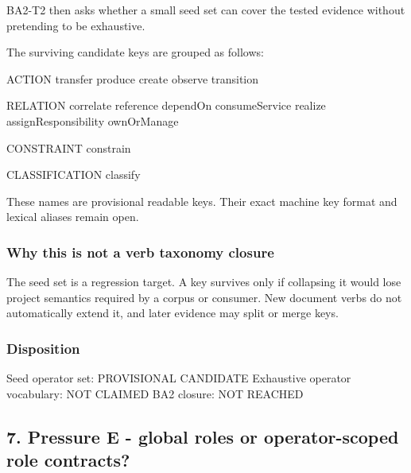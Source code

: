 \documentclass[
  10pt,
  letterpaper,
]{article}
\newenvironment{Shaded}{}{}
\newcommand{\NormalTok}[1]{#1}
\begin{document}
BA2-T2 then asks whether a small seed set can cover the tested evidence
without pretending to be exhaustive.

The surviving candidate keys are grouped as follows:

\begin{Shaded}
\begin{Highlighting}[]
\NormalTok{ACTION}
\NormalTok{  transfer}
\NormalTok{  produce}
\NormalTok{  create}
\NormalTok{  observe}
\NormalTok{  transition}

\NormalTok{RELATION}
\NormalTok{  correlate}
\NormalTok{  reference}
\NormalTok{  dependOn}
\NormalTok{  consumeService}
\NormalTok{  realize}
\NormalTok{  assignResponsibility}
\NormalTok{  ownOrManage}

\NormalTok{CONSTRAINT}
\NormalTok{  constrain}

\NormalTok{CLASSIFICATION}
\NormalTok{  classify}
\end{Highlighting}
\end{Shaded}

These names are provisional readable keys. Their exact machine key
format and lexical aliases remain open.

\subsubsection{Why this is not a verb taxonomy
closure}\label{why-this-is-not-a-verb-taxonomy-closure}

The seed set is a regression target. A key survives only if collapsing
it would lose project semantics required by a corpus or consumer. New
document verbs do not automatically extend it, and later evidence may
split or merge keys.

\subsubsection{Disposition}\label{disposition-2}

\begin{Shaded}
\begin{Highlighting}[]
\NormalTok{Seed operator set: PROVISIONAL CANDIDATE}
\NormalTok{Exhaustive operator vocabulary: NOT CLAIMED}
\NormalTok{BA2 closure: NOT REACHED}
\end{Highlighting}
\end{Shaded}

\subsection{7. Pressure E - global roles or operator-scoped role
contracts?}\label{pressure-e---global-roles-or-operator-scoped-role-contracts}
\end{document}
